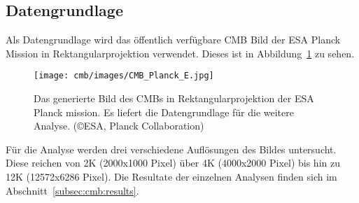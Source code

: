 \subsection{Datengrundlage}
Als Datengrundlage wird das öffentlich verfügbare CMB Bild der ESA Planck 
Mission in Rektangularprojektion \cite{cmb:public_equirectangular} 
verwendet. Dieses ist in Abbildung~\ref{fig:cmb-rectangular} zu sehen.

\begin{figure}
	\centering
	\texttt{[image: cmb/images/CMB\_Planck\_E.jpg]}
	\caption{Das generierte Bild des CMBs in Rektangularprojektion der ESA 
		Planck mission. Es liefert die Datengrundlage für die weitere Analyse. 
		(\copyright ESA, Planck Collaboration)}
	\label{fig:cmb-rectangular}
\end{figure}
%

Für die Analyse werden drei verschiedene Auflösungen des Bildes untersucht. 
Diese reichen von 2K (2000x1000 Pixel) über 4K (4000x2000 Pixel) bis hin zu 12K 
(12572x6286 Pixel). Die Resultate der einzelnen Analysen finden sich im 
Abschnitt~\ref{subsec:cmb:results}.
